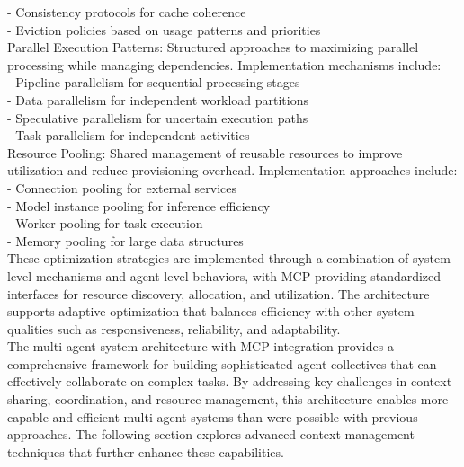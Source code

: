- Consistency protocols for cache coherence\\ \newline
- Eviction policies based on usage patterns and priorities\\ \newline
Parallel Execution Patterns: Structured approaches to maximizing parallel processing while managing dependencies. Implementation mechanisms include:\\ \newline
- Pipeline parallelism for sequential processing stages\\ \newline
- Data parallelism for independent workload partitions\\ \newline
- Speculative parallelism for uncertain execution paths\\ \newline
- Task parallelism for independent activities\\ \newline
Resource Pooling: Shared management of reusable resources to improve utilization and reduce provisioning overhead. Implementation approaches include:\\ \newline
- Connection pooling for external services\\ \newline
- Model instance pooling for inference efficiency\\ \newline
- Worker pooling for task execution\\ \newline
- Memory pooling for large data structures\\ \newline
These optimization strategies are implemented through a combination of system-level mechanisms and agent-level behaviors, with MCP providing standardized interfaces for resource discovery, allocation, and utilization. The architecture supports adaptive optimization that balances efficiency with other system qualities such as responsiveness, reliability, and adaptability.\\ \newline
The multi-agent system architecture with MCP integration provides a comprehensive framework for building sophisticated agent collectives that can effectively collaborate on complex tasks. By addressing key challenges in context sharing, coordination, and resource management, this architecture enables more capable and efficient multi-agent systems than were possible with previous approaches. The following section explores advanced context management techniques that further enhance these capabilities.\\ \newline
